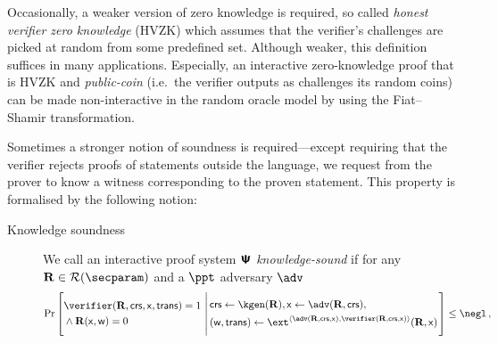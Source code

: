 \let\accentvec\vec \documentclass[runningheads]{llncs}
\begin{document}
Occasionally, a weaker version of zero knowledge is required, so called
\emph{honest verifier zero knowledge} (HVZK) which assumes that the verifier's
challenges are picked at random from some predefined set. Although weaker, this
definition suffices in many applications. Especially, an interactive
zero-knowledge proof that is HVZK and \emph{public-coin} (i.e.~the verifier
outputs as challenges its random coins) can be made non-interactive in the
random oracle model by using the Fiat--Shamir transformation.
	
Sometimes a stronger notion of soundness is required---except requiring that the
verifier rejects proofs of statements outside the language, we request from the
prover to know a witness corresponding to the proven statement. This property is
formalised by the following notion:
\begin{description}
\item[Knowledge soundness] We call an interactive proof system $\bm{\mathsf{\Psi}}$
  \emph{knowledge-sound} if for any $\REL \in \RELGEN(\secparam)$ and a $\ppt$
  adversary $\adv$
	\[
	\Pr\left[
		\begin{aligned}
			& \verifier(\REL, \crs, \inp, \trans) = 1 \\
			& \land \REL(\inp, \wit) = 0
	 \end{aligned}
	  \,\left|\,
	 \begin{aligned}
		 & \crs \gets \kgen(\REL), \inp \gets \adv(\REL, \crs), \\
		 & (\wit, \trans) \gets \ext^{\ip{\adv(\REL, \crs, \inp)}{\verifier(\REL, \crs, \inp)}}(\REL, \inp)
	 \end{aligned}
	 \vphantom{\begin{aligned}
		 \adv (\trans) = 1, \\
		 \text{if $\trans{}$ is accepting} \\
		 \pcind \text{then $\REL(\inp, \wit)$}
	 \end{aligned}}\right.
	 \right] \leq \negl\,,
 \]
\end{description}
\end{document}
